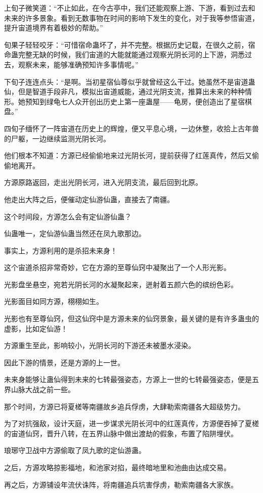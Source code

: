 \begin{this_body}
上旬子微笑道：“不止如此，在今古亭中，我们还能观察上游、下游，看到过去和未来的许多景象。看到无数事物在时间的影响下发生的变化，对于我等参悟宙道，提升宙道境界有着极妙的帮助。”

旬果子轻轻咬牙：“可惜宿命蛊坏了，并不完整。根据历史记载，在很久之前，宿命蛊完整无缺的时候，我们宙道的大能就能通过观察光阴长河的上下游，洞悉过去，观察未来，能够准确预知许多事情呢。”

下旬子连连点头：“是啊。当初星宿仙尊似乎就曾经这么干过。她虽然不是宙道蛊仙，但是智道手段非凡，模拟出宙道威能，通过光阴支流，推算出未来的种种情形。她预知到绿龟七人众开创出历史上第一座蛊屋——龟房，便创造出了星宿棋盘。”

四旬子缅怀了一阵宙道在历史上的辉煌，便又平息心境，一边休整，收拾上古年兽的尸躯，一边继续监测光阴长河。

他们根本不知道：方源已经偷偷地来过光阴长河，提前获得了红莲真传，然后又偷偷地离开。

方源原路返回，走出光阴长河，进入光阴支流，最后回到北原。

他走出大阵之后，便催动定仙游仙蛊，直接去了南疆。

这个时间段，方源怎么会有定仙游仙蛊？

仙蛊唯一，定仙游仙蛊当然还在凤九歌那边。

事实上，方源利用的是杀招未来身！

这个宙道杀招非常奇妙，它在方源的至尊仙窍中凝聚出了一个人形光影。

光影盘坐悬空，宛若光阴长河的水凝聚起来，迸射着五颜六色的缤纷色彩。

光影面目如同方源，栩栩如生。

光影也有至尊仙窍，但这仙窍中是方源未来的仙窍景象，最关键的是有许多蛊虫的虚影，比如定仙游！

方源重生至此，影响较小，光阴长河的下游还未被墨水浸染。

因此下游的情景，还是方源的上一世。

未来身能够让蛊仙得到未来的七转最强姿态，方源上一世的七转最强姿态，便是五界山脉大战之前一些。

那个时间，方源已将夏槎等南疆故乡追兵俘虏，大肆勒索南疆各大超级势力。

为了对抗强敌，设计天庭，进一步谋求光阴长河中的红莲真传，方源便吞掉了夏槎的宙道仙窍，晋升八转，在五界山脉中做出渡劫的假象，布置了陷阱埋伏。

琅琊守卫战中方源偷取了凤九歌的定仙游蛊。

之后，方源攻略掠影福地，和池家对掐，最终暗地里和池曲由达成交易。

再之后，方源铺设年流伏诛阵，将南疆追兵坑害俘虏，勒索南疆各大家族。


\end{this_body}
